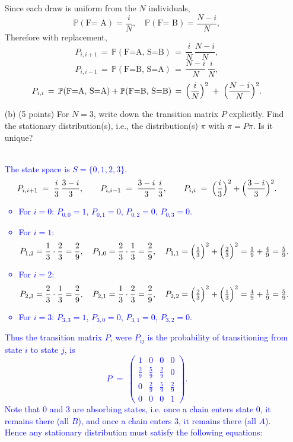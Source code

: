 \documentclass{article}
\begin{document}
\begin{enumerate}
{Since each draw is uniform from the $N$ individuals,
\[
\mathbb{P}(\text{F= A}) = \frac{i}{N}, 
\quad
\mathbb{P}(\text{F= B}) = \frac{N-i}{N},
\]
Therefore with replacement,
\[
P_{i,i+1} 
\,=\, \mathbb{P}(\text{F=A, S=B})
\,=\, \frac{i}{N}\,\frac{N-i}{N},
\]
\[
P_{i,i-1} 
\,=\, \mathbb{P}(\text{F=B, S=A})
\,=\, \frac{N-i}{N}\,\frac{i}{N},
\]
\[
P_{i,i} 
\,=\, \mathbb{P}(\text{F=A, S=A}) + \mathbb{P}(\text{F=B, S=B})
\,=\, \Bigl(\frac{i}{N}\Bigr)^2 \;+\; \Bigl(\frac{N-i}{N}\Bigr)^2.
\]
}
    \item[(b)] (5 points) For $N = 3$, write down the transition matrix $P$ explicitly. Find the stationary distribution(s), i.e., the distribution(s) $\pi$ with $\pi = P \pi$. Is it unique? \\ \\ 
        \textcolor{blue}{The state space is $S = \{0,1,2,3\}$.
\[
P_{i,i+1} \;=\; \frac{i}{3}\,\frac{3-i}{3}, 
\qquad
P_{i,i-1} \;=\; \frac{3-i}{3}\,\frac{i}{3}, 
\qquad
P_{i,i} \;=\; \Bigl(\frac{i}{3}\Bigr)^2 + \Bigl(\frac{3-i}{3}\Bigr)^2.
\]
\begin{itemize}
    \item For $i=0$: $P_{0,0} = 1$, $P_{0,1} = 0$, $P_{0,2} = 0$, $P_{0,3} = 0$.
    \item For $i=1$:
    \[
    P_{1,2} = \frac{1}{3}\cdot\frac{2}{3} = \frac{2}{9}, 
    \quad
    P_{1,0} = \frac{2}{3}\cdot\frac{1}{3} = \frac{2}{9},
    \quad
    P_{1,1} = \Bigl(\tfrac{1}{3}\Bigr)^2 + \Bigl(\tfrac{2}{3}\Bigr)^2 = \tfrac{1}{9} + \tfrac{4}{9} = \tfrac{5}{9}.
    \]
    \item For $i=2$:
    \[
    P_{2,3} = \frac{2}{3}\cdot\frac{1}{3} = \frac{2}{9}, 
    \quad
    P_{2,1} = \frac{1}{3}\cdot\frac{2}{3} = \frac{2}{9},
    \quad
    P_{2,2} = \Bigl(\tfrac{2}{3}\Bigr)^2 + \Bigl(\tfrac{1}{3}\Bigr)^2 = \tfrac{4}{9} + \tfrac{1}{9} = \tfrac{5}{9}.
    \]
    \item For $i=3$: $P_{3,3} = 1$, $P_{3,0} = 0$, $P_{3,1} = 0$, $P_{3,2} = 0$.
\end{itemize}
Thus the transition matrix $P$, were $P_{ij}$ is the probability of transitioning from state $i$ to state $j$, is
\[
P \;=\;
\begin{pmatrix}
1 & 0 & 0 & 0\\[6pt]
\tfrac{2}{9} & \tfrac{5}{9} & \tfrac{2}{9} & 0\\[6pt]
0 & \tfrac{2}{9} & \tfrac{5}{9} & \tfrac{2}{9}\\[6pt]
0 & 0 & 0 & 1
\end{pmatrix}.
\]
Note that $0$ and $3$ are absorbing states, i.e. once a chain enters state $0$, it remains there (all $B$), and once a chain enters $3$, it remains there (all $A$). Hence any stationary distribution must satisfy the following equations:
}
\end{enumerate}
\end{document}
